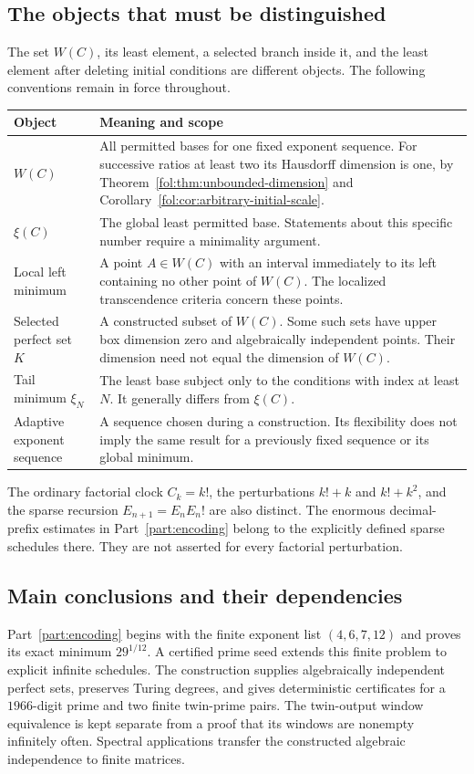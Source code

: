 \documentclass[11pt,a4paper]{article}
\theoremstyle{definition}
\theoremstyle{remark}
\numberwithin{equation}{section}
\begin{document}
\subsection{The objects that must be distinguished}
The set $W(C)$, its least element, a selected branch inside it, and the
least element after deleting initial conditions are different objects.
The following conventions remain in force throughout.
\begin{longtable}{@{}p{}p{}@{}}
\toprule
Object & Meaning and scope\\ \midrule
$W(C)$ & All permitted bases for one fixed exponent sequence.
For successive ratios at least two its Hausdorff dimension is one,
by Theorem~\ref{fol:thm:unbounded-dimension} and
Corollary~\ref{fol:cor:arbitrary-initial-scale}.\\[4pt]
$\xi(C)$ & The global least permitted base. Statements about this
specific number require a minimality argument.\\[4pt]
Local left minimum & A point $A\in W(C)$ with an interval immediately
to its left containing no other point of $W(C)$. The localized
transcendence criteria concern these points.\\[4pt]
Selected perfect set $K$ & A constructed subset of $W(C)$. Some such
sets have upper box dimension zero and algebraically independent points.
Their dimension need not equal the dimension of $W(C)$.\\[4pt]
Tail minimum $\xi_N$ & The least base subject only to the conditions
with index at least $N$. It generally differs from $\xi(C)$.\\[4pt]
Adaptive exponent sequence & A sequence chosen during a construction.
Its flexibility does not imply the same result for a previously fixed
sequence or its global minimum.\\
\bottomrule
\end{longtable}

The ordinary factorial clock $C_k=k!$, the perturbations $k!+k$ and
$k!+k^2$, and the sparse recursion $E_{n+1}=E_nE_n!$ are also distinct.
The enormous decimal-prefix estimates in Part~\ref{part:encoding}
belong to the explicitly defined sparse schedules there. They are not
asserted for every factorial perturbation.

\subsection{Main conclusions and their dependencies}
Part~\ref{part:encoding} begins with the finite exponent list
$(4,6,7,12)$ and proves its exact minimum $29^{1/12}$.
A certified prime seed extends this finite problem to explicit infinite
schedules. The construction supplies algebraically independent perfect
sets, preserves Turing degrees, and gives deterministic certificates for
a $1966$-digit prime and two finite twin-prime pairs. The twin-output
window equivalence is kept separate from a proof that its windows are
nonempty infinitely often. Spectral applications transfer the constructed
algebraic independence to finite matrices.
\end{document}
